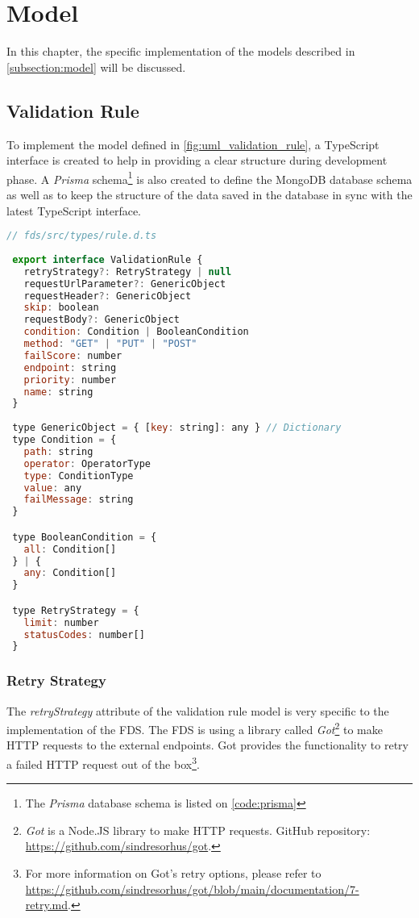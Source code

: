 \section{Model}

In this chapter, the specific implementation of the models described in \autoref{subsection:model} will be discussed. 

 \subsection{Validation Rule}
  To implement the model defined in \autoref{fig:uml_validation_rule}, a TypeScript interface is created to help in providing a clear structure during development phase. A \emph{Prisma} schema\footnote{The \emph{Prisma} database schema is listed on \autoref{code:prisma}} is also created to define the MongoDB database schema as well as to keep the structure of the data saved in the database in sync with the latest TypeScript interface. 

  \begin{lstlisting}[caption={TypeScript interface of a validation rule (TypeScript)}, language=js]
 // fds/src/types/rule.d.ts
 
 export interface ValidationRule {
   retryStrategy?: RetryStrategy | null
   requestUrlParameter?: GenericObject
   requestHeader?: GenericObject
   skip: boolean
   requestBody?: GenericObject
   condition: Condition | BooleanCondition
   method: "GET" | "PUT" | "POST" 
   failScore: number
   endpoint: string
   priority: number
   name: string
 }
 
 type GenericObject = { [key: string]: any } // Dictionary
 type Condition = {
   path: string
   operator: OperatorType
   type: ConditionType
   value: any
   failMessage: string
 }

 type BooleanCondition = {
   all: Condition[]
 } | {
   any: Condition[]
 }

 type RetryStrategy = {
   limit: number
   statusCodes: number[] 
 }
  \end{lstlisting}
 
 \subsubsection{Retry Strategy}
  The \emph{retryStrategy} attribute of the validation rule model is very specific to the implementation of the FDS. The FDS is using a library called \emph{Got}\footnote{\emph{Got} is a Node.JS library to make HTTP requests. GitHub repository: \url{https://github.com/sindresorhus/got}.} to make HTTP requests to the external endpoints. Got provides the functionality to retry a failed HTTP request out of the box\footnote{For more information on Got's retry options, please refer to \url{https://github.com/sindresorhus/got/blob/main/documentation/7-retry.md}.}.

